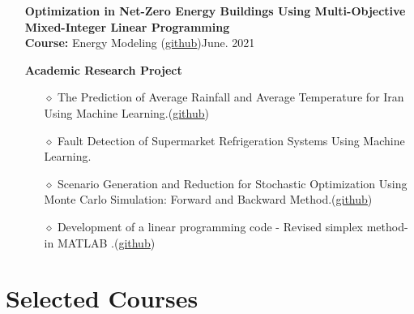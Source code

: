 \documentclass[letter,20pt]{article}
\begin{document}
\begin{itemize}[noitemsep, topsep=6pt, after=\vspace{-0.5 mm},leftmargin = 0ex,rightmargin=1ex]
	\small \item[]  \textbf {Optimization in Net-Zero Energy Buildings Using Multi-Objective Mixed-Integer Linear Programming}\vspace{3pt}\\
	{\footnotesize \textbf{Course:} Energy Modeling (\href{https://github.com/Mortezano1/Smart-Buliding-Modeling}{\underline{github}}\vspace{5pt})}\vspace{10pt}\hfill {\footnotesize June. 2021}\\

 
	\item[]  \textbf {Academic Research Project}
	
	\begin{itemize}[noitemsep, topsep=3pt, after=\vspace{-5 mm},leftmargin = 4ex]
		\item[$\diamond$]{\footnotesize The Prediction of Average Rainfall and Average Temperature for Iran Using Machine Learning.(\href{https://github.com/Mortezano1/The-prediction-of-average-rainfall-and-average-temperature-for-Iran-using-machine-learning}{\underline{github}}\vspace{5pt})}
        \item[$\diamond$]{\footnotesize Fault Detection of Supermarket Refrigeration Systems Using Machine Learning.}
        \item[$\diamond$]{\footnotesize Scenario Generation and Reduction for Stochastic Optimization Using Monte Carlo Simulation: Forward and Backward Method.(\href{https://github.com/Mortezano1/Monte-carlo-simulation-and-scenario-reduction-Forward-}{\underline{github}}\vspace{5pt})}
        \item[$\diamond$]{\footnotesize Development of a linear programming code - Revised simplex method- in MATLAB
.(\href{https://github.com/Mortezano1/Revised-simplex}{\underline{github}}\vspace{5pt})}
	\end{itemize}\vspace{10pt}
	
\end{itemize}
\section{Selected Courses}	    
\vspace{5pt}
\end{document}

